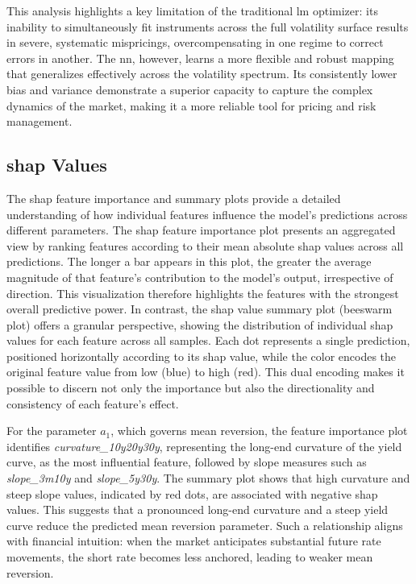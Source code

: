 This analysis highlights a key limitation of the traditional \ac{lm} optimizer: its inability to simultaneously fit instruments across the full volatility surface results in severe, systematic mispricings, overcompensating in one regime to correct errors in another. The \ac{nn}, however, learns a more flexible and robust mapping that generalizes effectively across the volatility spectrum. Its consistently lower bias and variance demonstrate a superior capacity to capture the complex dynamics of the market, making it a more reliable tool for pricing and risk management.

\subsection{\ac{shap} Values}
The \ac{shap} feature importance and summary plots provide a detailed understanding of how individual features influence the model's predictions across different parameters. The \ac{shap} feature importance plot presents an aggregated view by ranking features according to their mean absolute \ac{shap} values across all predictions. The longer a bar appears in this plot, the greater the average magnitude of that feature's contribution to the model's output, irrespective of direction. This visualization therefore highlights the features with the strongest overall predictive power. In contrast, the \ac{shap} value summary plot (beeswarm plot) offers a granular perspective, showing the distribution of individual \ac{shap} values for each feature across all samples. Each dot represents a single prediction, positioned horizontally according to its \ac{shap} value, while the color encodes the original feature value from low (blue) to high (red). This dual encoding makes it possible to discern not only the importance but also the directionality and consistency of each feature's effect.

For the parameter \(a_1\), which governs mean reversion, the feature importance plot identifies \textit{curvature\_10y20y30y}, representing the long-end curvature of the yield curve, as the most influential feature, followed by slope measures such as \textit{slope\_3m10y} and \textit{slope\_5y30y}. The summary plot shows that high curvature and steep slope values, indicated by red dots, are associated with negative \ac{shap} values. This suggests that a pronounced long-end curvature and a steep yield curve reduce the predicted mean reversion parameter. Such a relationship aligns with financial intuition: when the market anticipates substantial future rate movements, the short rate becomes less anchored, leading to weaker mean reversion.


